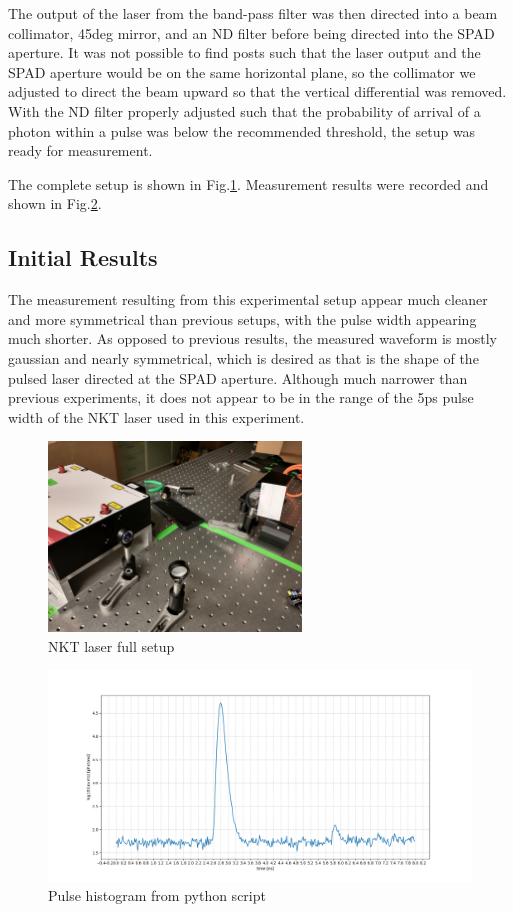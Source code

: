 \documentclass[a4paper]{article}
\begin{document}
The output of the laser from the band-pass filter was then directed into a beam collimator, 45deg mirror, and an ND filter before being directed into the SPAD aperture. It was not possible to find posts such that the laser output and the SPAD aperture would be on the same horizontal plane, so the collimator we adjusted to direct the beam upward so that the vertical differential was removed. With the ND filter properly adjusted such that the probability of arrival of a photon within a pulse was below the recommended threshold, the setup was ready for measurement.

The complete setup is shown in Fig.\ref{fig:nkt_same_table}.
Measurement results were recorded and shown in Fig.\ref{fig:python_graph}.

\subsection{Initial Results}

The measurement resulting from this experimental setup appear much cleaner and more symmetrical than previous setups, with the pulse width appearing much shorter. As opposed to previous results, the measured waveform is mostly gaussian and nearly symmetrical, which is desired as that is the shape of the pulsed laser directed at the SPAD aperture. Although much narrower than previous experiments, it does not appear to be in the range of the 5ps pulse width of the NKT laser used in this experiment.

\begin{figure}
\centering
\includegraphics[width=0.6\textwidth]{IMG_20220422_142651049_HDR.jpg}
\caption{\label{fig:nkt_same_table}NKT laser full setup}
\end{figure}

\begin{figure}
\centering
\includegraphics[width=1.0\textwidth]{python_pulse_graph.png}
\caption{\label{fig:python_graph}Pulse histogram from python script}
\end{figure}
\end{document}
